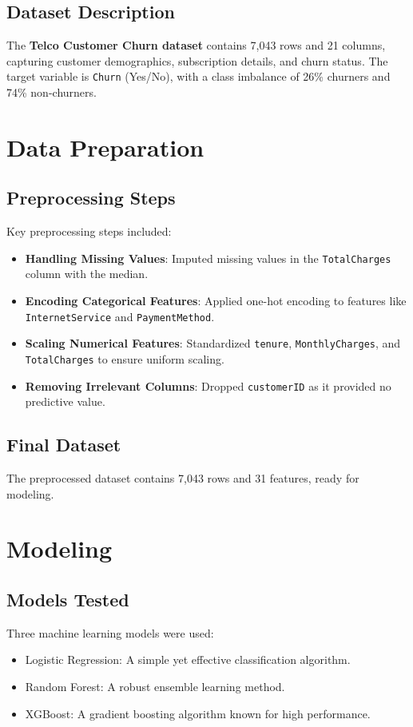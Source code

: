 \documentclass[12pt]{article}
\begin{document}
\subsection{Dataset Description}
The \textbf{Telco Customer Churn dataset} contains 7,043 rows and 21 columns, capturing customer demographics, subscription details, and churn status. The target variable is \texttt{Churn} (Yes/No), with a class imbalance of 26\% churners and 74\% non-churners.

\section{Data Preparation}

\subsection{Preprocessing Steps}
Key preprocessing steps included:
\begin{itemize}
    \item \textbf{Handling Missing Values}: Imputed missing values in the \texttt{TotalCharges} column with the median.
    \item \textbf{Encoding Categorical Features}: Applied one-hot encoding to features like \texttt{InternetService} and \texttt{PaymentMethod}.
    \item \textbf{Scaling Numerical Features}: Standardized \texttt{tenure}, \texttt{MonthlyCharges}, and \texttt{TotalCharges} to ensure uniform scaling.
    \item \textbf{Removing Irrelevant Columns}: Dropped \texttt{customerID} as it provided no predictive value.
\end{itemize}

\subsection{Final Dataset}
The preprocessed dataset contains 7,043 rows and 31 features, ready for modeling.

\section{Modeling}

\subsection{Models Tested}
Three machine learning models were used:
\begin{itemize}
    \item Logistic Regression: A simple yet effective classification algorithm.
    \item Random Forest: A robust ensemble learning method.
    \item XGBoost: A gradient boosting algorithm known for high performance.
\end{itemize}
\end{document}
